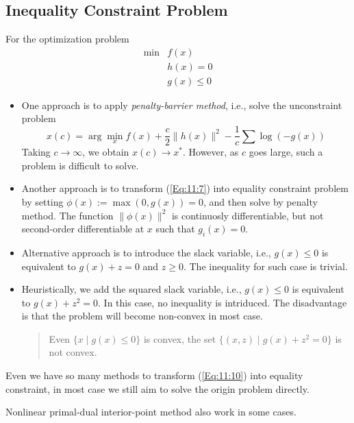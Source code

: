 \subsection{Inequality Constraint Problem}
For the optimization problem
\begin{equation}\label{Eq:11:10}
\begin{array}{ll}
\min&f(x)\\
&h(x)=0\\
&g(x)\le0
\end{array}
\end{equation}
\begin{itemize}
\item
One approach is to apply \emph{penalty-barrier method}, i.e., solve the unconstraint problem
\begin{equation}
x(c)=\arg\min_{x} f(x)+\frac{c}{2}\|h(x)\|^2-\frac{1}{c}\sum\log(-g(x))
\end{equation}
Taking $c\to\infty$, we obtain $x(c)\to x^*$. However, as $c$ goes large, such a problem is difficult to solve.
\item
Another approach is to transform (\ref{Eq:11:7}) into equality constraint problem by setting $\phi(x):=\max(0,g(x))=0$, and then solve by penalty method. The function $\|\phi(x)\|^2$ is continuosly differentiable, but not second-order differentiable at $x$ such that $g_i(x)=0$.
\item
Alternative approach is to introduce the slack variable, i.e., $g(x)\le 0$ is equivalent to $g(x)+z=0$ and $z\ge0$. The inequality for such case is trivial.
\item
Heuristically, we add the squared slack variable, i.e., $g(x)\le0$ is equivalent to $g(x)+z^2=0$. In this case, no inequality is intriduced. The disadvantage is that the problem will become non-convex in most case.
\begin{quotation}
Even $\{x\mid g(x)\le0\}$ is convex, the set $\{(x,z)\mid g(x)+z^2=0\}$ is not convex.
\end{quotation}
\end{itemize}
Even we have so many methods to transform (\ref{Eq:11:10}) into equality constraint, in most case we still aim to solve the origin problem directly.
\begin{remark}
Nonlinear primal-dual interior-point method also work in some cases.
\end{remark}

